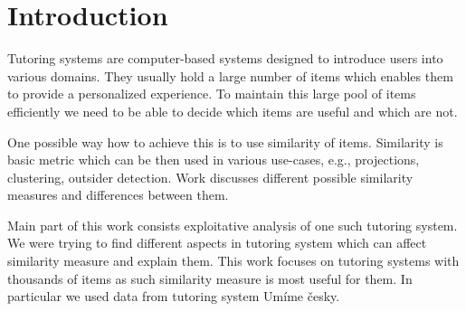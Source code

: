\documentclass[
  digital, %
  table,   %
  nolof,     %
  nolot,     %
  nocover
]{fithesis3}
\begin{document}
\newcommand{\umimeCesky}{\textcolor[rgb]{0.02,0.2,0.12}{Umíme česky}}

%
%
%
%
%
%

\chapter*{Introduction}




Tutoring systems are computer-based systems designed to introduce users into various domains. They usually hold a large number of items which enables them to provide a personalized experience. To maintain this large pool of items efficiently we need to be able to decide which items are useful and which are not.


One possible way how to achieve this is to use similarity of items. Similarity is basic metric which can be then used in various use-cases, e.g., projections, clustering, outsider detection. Work discusses different possible similarity measures and differences between them.



Main part of this work consists exploitative analysis of one such tutoring system. We were trying to find different aspects in tutoring system which can affect similarity measure and explain them. This work focuses on tutoring systems with thousands of items as such similarity measure is most useful for them. In particular we used data from tutoring system \umimeCesky{}.
\end{document}
